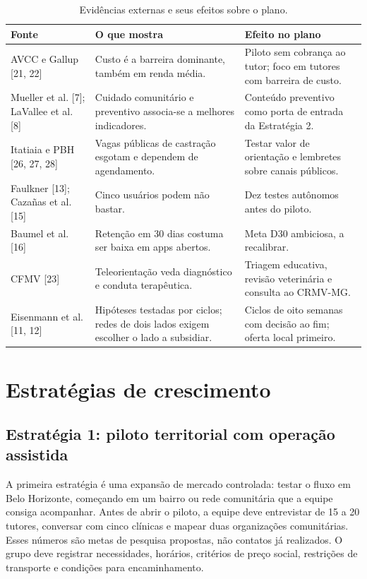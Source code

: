 \documentclass[12pt,a4paper]{article}
\begin{document}
\begin{table}[H]
\centering
\small
\caption{Evidências externas e seus efeitos sobre o plano.}
\begin{tabularx}{\textwidth}{P{3.4cm}YY}
\toprule
\textbf{Fonte} & \textbf{O que mostra} & \textbf{Efeito no plano} \\
\midrule
AVCC e Gallup [21, 22] & Custo é a barreira dominante, também em renda média. & Piloto sem cobrança ao tutor; foco em tutores com barreira de custo. \\
Mueller et al. [7]; LaVallee et al. [8] & Cuidado comunitário e preventivo associa-se a melhores indicadores. & Conteúdo preventivo como porta de entrada da Estratégia 2. \\
Itatiaia e PBH [26, 27, 28] & Vagas públicas de castração esgotam e dependem de agendamento. & Testar valor de orientação e lembretes sobre canais públicos. \\
Faulkner [13]; Cazañas et al. [15] & Cinco usuários podem não bastar. & Dez testes autônomos antes do piloto. \\
Baumel et al. [16] & Retenção em 30 dias costuma ser baixa em apps abertos. & Meta D30 ambiciosa, a recalibrar. \\
CFMV [23] & Teleorientação veda diagnóstico e conduta terapêutica. & Triagem educativa, revisão veterinária e consulta ao CRMV-MG. \\
Eisenmann et al. [11, 12] & Hipóteses testadas por ciclos; redes de dois lados exigem escolher o lado a subsidiar. & Ciclos de oito semanas com decisão ao fim; oferta local primeiro. \\
\bottomrule
\end{tabularx}
\end{table}

\section{Estratégias de crescimento}

\subsection{Estratégia 1: piloto territorial com operação assistida}

A primeira estratégia é uma expansão de mercado controlada: testar o fluxo em Belo Horizonte, começando em um bairro ou rede comunitária que a equipe consiga acompanhar. Antes de abrir o piloto, a equipe deve entrevistar de 15 a 20 tutores, conversar com cinco clínicas e mapear duas organizações comunitárias. Esses números são metas de pesquisa propostas, não contatos já realizados. O grupo deve registrar necessidades, horários, critérios de preço social, restrições de transporte e condições para encaminhamento.
\end{document}
